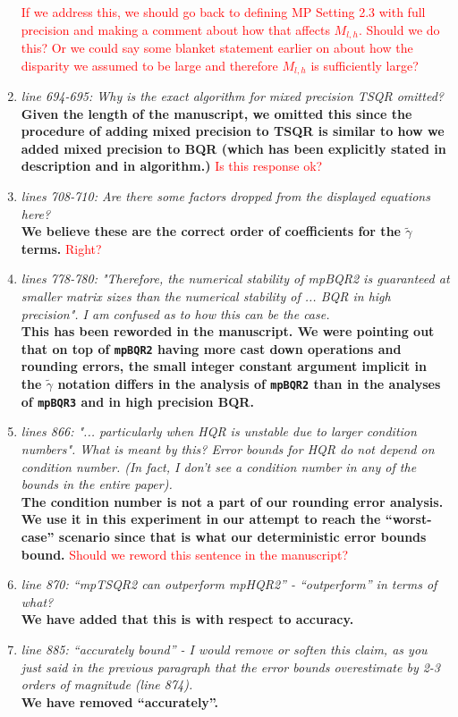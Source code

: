 \documentclass[final,onefignum,onetabnum]{siamart190516}
\newcommand{\red}[1]{\textcolor{red}{#1}}
\begin{document}
\begin{enumerate}
    \red{If we address this, we should go back to defining MP Setting 2.3 with full precision and making a comment about how that affects $M_{l,h}$. Should we do this? Or we could say some blanket statement earlier on about how the disparity we assumed to be large and therefore $M_{l,h}$ is sufficiently large?}
    \item {\it line 694-695: Why is the exact algorithm for mixed precision TSQR omitted? }\\
    {\bf Given the length of the manuscript, we omitted this since the procedure of adding mixed precision to TSQR is similar to how we added mixed precision to BQR (which has been explicitly stated in description and in algorithm.)} \red{Is this response ok?}
    \item {\it lines 708-710: Are there some factors dropped from the displayed equations here? }\\
    {\bf We believe these are the correct order of coefficients for the $\tilde{\gamma}$ terms.} \red{ Right?}
    \item {\it lines 778-780: "Therefore, the numerical stability of mpBQR2 is guaranteed at smaller matrix sizes than the numerical stability of ... BQR in high precision". I am confused as to how this can be the case. }\\
    {\bf This has been reworded in the manuscript. We were pointing out that on top of {\tt mpBQR2} having more cast down operations and rounding errors, the small integer constant argument implicit in the $\tilde{\gamma}$ notation differs in the analysis of {\tt mpBQR2} than in the analyses of {\tt mpBQR3} and in high precision BQR.}
    \item {\it lines 866: "... particularly when HQR is unstable due to larger condition numbers". What is meant by this? Error bounds for HQR do not depend on condition number. (In fact, I don't see a condition number in any of the bounds in the entire paper). }\\
    {\bf The condition number is not a part of our rounding error analysis. We use it in this experiment in our attempt to reach the ``worst-case'' scenario since that is what our deterministic error bounds bound. } \red{Should we reword this sentence in the manuscript?}
    \item {\it line 870: ``mpTSQR2 can outperform mpHQR2'' - ``outperform'' in terms of what? } \\
    {\bf We have added that this is with respect to accuracy.}
    \item {\it line 885: ``accurately bound'' - I would remove or soften this claim, as you just said in the previous paragraph that the error bounds overestimate by 2-3 orders of magnitude (line 874).}\\
    {\bf We have removed ``accurately''.}
\end{enumerate}
\end{document}

